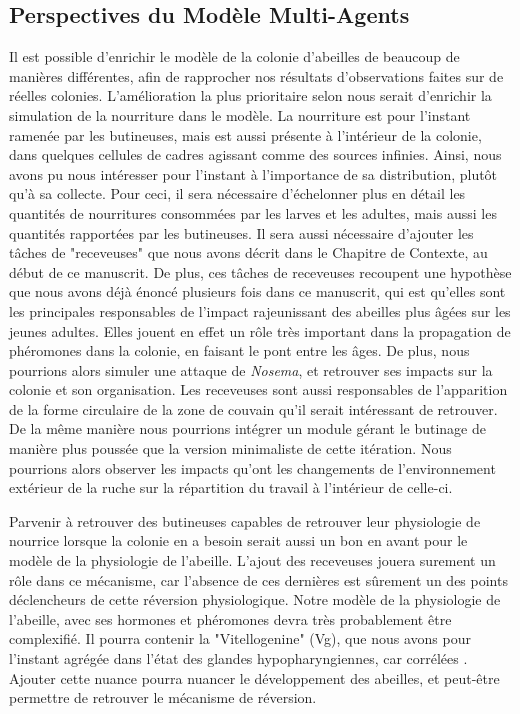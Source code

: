	\subsection{Perspectives du Modèle Multi-Agents}
	Il est possible d'enrichir le modèle de la colonie d'abeilles de beaucoup de manières différentes, afin de rapprocher nos résultats d'observations faites sur de réelles colonies. L'amélioration la plus prioritaire selon nous serait d'enrichir la simulation de la nourriture dans le modèle. La nourriture est pour l'instant ramenée par les butineuses, mais est aussi présente à l'intérieur de la colonie, dans quelques cellules de cadres agissant comme des sources infinies. Ainsi, nous avons pu nous intéresser pour l'instant à l'importance de sa distribution, plutôt qu'à sa collecte. Pour ceci, il sera nécessaire d'échelonner plus en détail les quantités de nourritures consommées par les larves et les adultes, mais aussi les quantités rapportées par les butineuses. Il sera aussi nécessaire d'ajouter les tâches de "receveuses" que nous avons décrit dans le Chapitre de Contexte, au début de ce manuscrit. De plus, ces tâches de receveuses recoupent une hypothèse que nous avons déjà énoncé plusieurs fois dans ce manuscrit, qui est qu'elles sont les principales responsables de l'impact rajeunissant des abeilles plus âgées sur les jeunes adultes. Elles jouent en effet un rôle très important dans la propagation de phéromones dans la colonie, en faisant le pont entre les âges. De plus, nous pourrions alors simuler une attaque de \textit{Nosema}, et retrouver ses impacts sur la colonie et son organisation. Les receveuses sont aussi responsables de l'apparition de la forme circulaire de la zone de couvain \cite{camazine_self-organizing_1991} qu'il serait intéressant de retrouver. De la même manière nous pourrions intégrer un module gérant le butinage de manière plus poussée que la version minimaliste de cette itération. Nous pourrions alors observer les impacts qu'ont les changements de l'environnement extérieur de la ruche sur la répartition du travail à l'intérieur de celle-ci.
	
	Parvenir à retrouver des butineuses capables de retrouver leur physiologie de nourrice lorsque la colonie en a besoin serait aussi un bon en avant pour le modèle de la physiologie de l'abeille. L'ajout des receveuses jouera surement un rôle dans ce mécanisme, car l'absence de ces dernières est sûrement un des points déclencheurs de cette réversion physiologique. Notre modèle de la physiologie de l'abeille, avec ses hormones et phéromones devra très probablement être complexifié. Il pourra contenir la "Vitellogenine" (Vg), que nous avons pour l'instant agrégée dans l'état des glandes hypopharyngiennes, car corrélées \cite{johnson_division_2010}. Ajouter cette nuance pourra nuancer le développement des abeilles, et peut-être permettre de retrouver le mécanisme de réversion.
	
